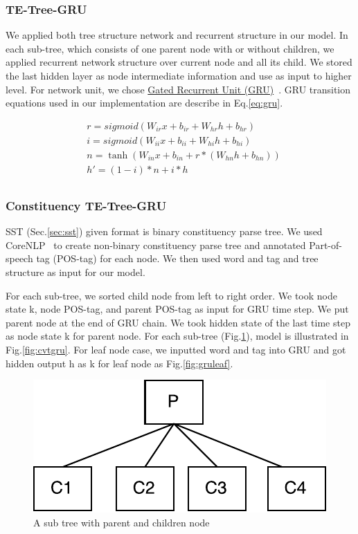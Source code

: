 \subsubsection{TE-Tree-GRU}
We applied both tree structure network and recurrent structure in our model.
In each sub-tree, which consists of one parent node with or without children, we applied recurrent network structure over current node and all its child.
We stored the last hidden layer as node intermediate information and use as input to higher level.
For network unit, we chose \hyperref[sec:GRU]{Gated Recurrent Unit (GRU)}~\cite{cho2014learning}.
GRU transition equations used in our implementation are describe in Eq.\ref{eq:gru}.

\begin{equation}
\label{eq:gru}
\begin{aligned}
&r = sigmoid(W_{ir} x + b_{ir} + W_{hr} h + b_{hr}) \\
&i = sigmoid(W_{ii} x + b_{ii} + W_{hi} h + b_{hi}) \\
&n = \tanh(W_{in} x + b_{in} + r * (W_{hn} h + b_{hn})) \\
&h' = (1 - i) * n + i * h\\
\end{aligned}
\end{equation}

\subsubsection{Constituency TE-Tree-GRU} \label{sec:VTtreeConstituency}
SST (Sec.\ref{sec:sst}) given format is binary constituency parse tree. We used CoreNLP~\cite{manning2014stanford} to create non-binary constituency parse tree and annotated Part-of-speech tag (POS-tag) for each node. We then used word and tag and tree structure as input for our model.

For each sub-tree, we sorted child node from left to right order. We took node state k, node POS-tag, and parent POS-tag as input for GRU time step. We put parent node at the end of GRU chain. We took hidden state of the last time step as node state k for parent node. For each sub-tree (Fig.\ref{fig:treecp}), model is illustrated in Fig.\ref{fig:cvtgru}. For leaf node case, we inputted word and tag into GRU and got hidden output h as k for leaf node as Fig.\ref{fig:gruleaf}.
\begin{figure}[H]
    \centering
    \includegraphics[width=0.5\linewidth]{figure/treecp}
    \caption[A sub tree with parent and children node]{A sub tree with parent and children node}
    \label{fig:treecp}
\end{figure}

